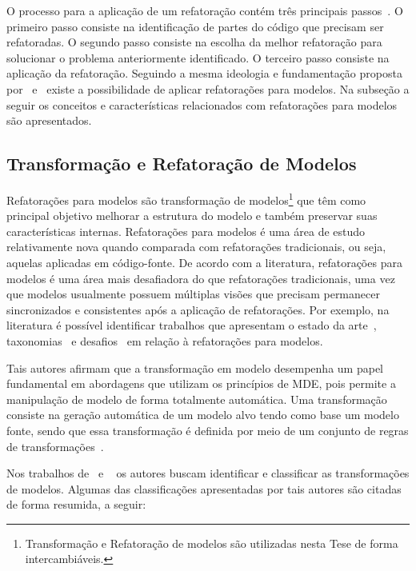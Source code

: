 O processo para a aplicação de um refatoração contém três principais passos~\cite{Wake_2003}. O primeiro passo consiste na identificação de partes do código que precisam ser refatoradas. O segundo passo consiste na escolha da melhor refatoração para solucionar o problema anteriormente identificado. O terceiro passo consiste na aplicação da refatoração. Seguindo a mesma ideologia e fundamentação proposta por~ e~ existe a possibilidade de aplicar refatorações para modelos. Na subseção a seguir os conceitos e características relacionados com refatorações para modelos são apresentados.


\subsection{Transformação e Refatoração de Modelos}\label{sec:transformacoes_de_modelos}

Refatorações para modelos são transformação de modelos\footnote{Transformação e Refatoração de modelos são utilizadas nesta Tese de forma intercambiáveis.} que têm como principal objetivo melhorar a estrutura do modelo e também preservar suas características internas. Refatorações para modelos é uma área de estudo relativamente nova quando comparada com refatorações tradicionais, ou seja, aquelas aplicadas em código-fonte. De acordo com a literatura, refatorações para modelos é uma área mais desafiadora do que refatorações tradicionais, uma vez que modelos usualmente possuem múltiplas visões que precisam permanecer sincronizados e consistentes após a aplicação de refatorações. Por exemplo, na literatura é possível identificar trabalhos que apresentam o estado da arte~\cite{Tom_2008_2008}, taxonomias~\cite{Maddeh_2010} e desafios~\cite{mens_03_refactoring, Mens07RefacTools, Van_Der_Straeten_2009, mens2003refactoring_novo_rafa} em relação à refatorações para modelos. 

Tais autores afirmam que a transformação em modelo desempenha um papel fundamental em abordagens que utilizam os princípios de MDE, pois permite a manipulação de modelo de forma totalmente automática. Uma transformação consiste na geração automática de um modelo alvo tendo como base um modelo fonte, sendo que essa transformação é definida por meio de um conjunto de regras de transformações~\cite{Mens_2006}. 

Nos trabalhos de~ e ~ os autores buscam identificar e classificar as transformações de modelos. Algumas das classificações apresentadas por tais autores são citadas de forma resumida, a seguir:

